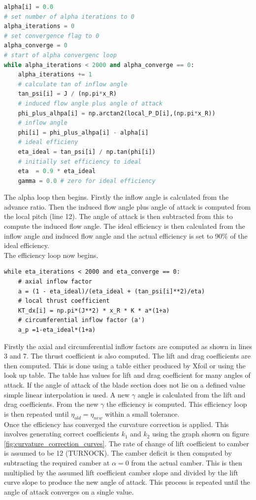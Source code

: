 \documentclass[]{report}
\begin{document}
\begin{lstlisting}[language = Python]
alpha[i] = 0.0
# set number of alpha iterations to 0
alpha_iterations = 0
# set convergence flag to 0
alpha_converge = 0
# start of alpha convergenc loop
while alpha_iterations < 2000 and alpha_converge == 0: 
	alpha_iterations += 1
	# calculate tan of inflow angle
	tan_psi[i] = J / (np.pi*x_R)
	# induced flow angle plus angle of attack
	phi_plus_alhpa[i] = np.arctan2(local_P_D[i],(np.pi*x_R))
	# inflow angle
	phi[i] = phi_plus_alhpa[i] - alpha[i]
	# ideal efficieny
	eta_ideal = tan_psi[i] / np.tan(phi[i])
	# initially set efficiency to ideal  
	eta  = 0.9 * eta_ideal
	gamma = 0.0 # zero for ideal efficiency
\end{lstlisting}
The alpha loop then begins. Firstly the inflow angle is calculated from the advance ratio. Then the induced flow angle plus angle of attack is computed from the local pitch (line 12). The angle of attack is then subtracted from this to compute the induced flow angle. The ideal efficiency is then calculated from the inflow angle and induced flow angle and the actual efficiency is set to 90\% of the ideal efficiency.
\\
The efficiency loop now begins.
\begin{lstlisting}
while eta_iterations < 2000 and eta_converge == 0:
	# axial inflow factor
	a = (1 - eta_ideal)/(eta_ideal + (tan_psi[i]**2)/eta)
	# local thrust coefficient
	KT_dx[i] = np.pi*(J**2) * x_R * K * a*(1+a)
	# circumferential inflow factor (a')
	a_p =1-eta_ideal*(1+a)
\end{lstlisting}
Firstly the axial and circumferential inflow factors are computed as shown in lines 3 and 7. The thrust coefficient is also computed. The lift and drag coefficients are then computed. This is done using a table either produced by Xfoil or using the look up table. The table has values for lift and drag coefficient for many angles of attack. If the angle of attack of the blade section does not lie on a defined value simple linear interpolation is used. A new $\gamma$ angle is calculated from the lift and drag coefficients. From the new $\gamma$ the efficiency is computed. This efficiency loop is then repeated until $\eta_{old} = \eta_{new}$ within a small tolerance.
\\
Once the efficiency has converged the curvature correction is applied. This involves generating correct coefficients $k_1$ and $k_2$ using the graph shown on figure \ref{fig:curvature_correction_curves}. The rate of change of lift coefficient to camber is assumed to be 12 (TURNOCK). The camber deficit is then computed by subtracting the required camber at $\alpha = 0$ from the actual camber. This is then multiplied by the assumed lift coefficient camber slope and divided by the lift curve slope to produce the new angle of attack. This process is repeated until the angle of attack converges on a single value. 
\end{document}
